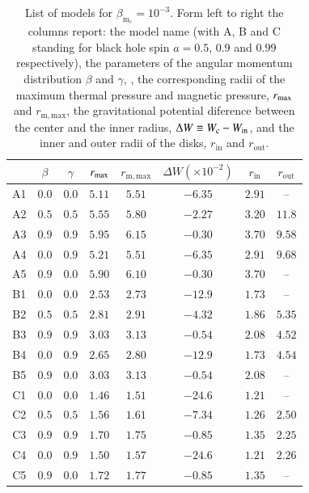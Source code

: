 \documentclass{aa}
\begin{document}
\begin{table}
\caption{List of models for $\beta_{\mathrm{m}_{\mathrm{c}}} = 10^{-3}
$. Form left to right the columns report: the model name (with A, B and C standing for black hole spin $a = 0.5$, $0.9$ and $0.99$ respectively), the parameters of the angular momentum distribution $\beta$ and $\gamma$, , the corresponding radii of the maximum thermal pressure and magnetic pressure, $r_{{\rm{max}}}$ and $r_{{\mathrm{m, max}}}$, the gravitational potential diference between the center and the inner radius, $\Delta W\equiv W_{\rm c}-W_{\rm in}$, and the inner and outer radii of the disks, $r_{\mathrm{in}}$ and $r_{\mathrm{out}}$.}             
\label{table:3}      
\centering          
\begin{tabular}{c c c c  c c c c}
\hline\hline       
 & $\beta$ & $\gamma$ & $r_{\rm{max}}$ &  $r_{\mathrm{m, max}}$ & $\Delta W (\times 10^{-2})$ & $r_{\mathrm{in}}$ & $r_{\mathrm{out}}$ \\ 
\hline           
A1 & $0.0$ & $0.0$ & $5.11$ &  $5.51$  & $-6.35$ & $2.91$ & -- \\ 
A2 & $0.5$ & $0.5$ & $5.55$ &  $5.80$  & $-2.27$ & $3.20$ & $11.8$\\ 
A3 & $0.9$ & $0.9$ & $5.95$ &  $6.15$  & $-0.30$ & $3.70$ &  $9.58$\\ 
A4 & $0.0$ & $0.9$ & $5.21$ &  $5.51$  & $-6.35$ & $2.91$ & $9.68$\\  
A5 & $0.9$ & $0.0$ & $5.90$ &  $6.10$  & $-0.30$ & $3.70$ & --\\
 \hline 
B1 & $0.0$ & $0.0$ & $2.53$ &  $2.73$  & $-12.9$ & $1.73$ & -- \\ 
B2 & $0.5$ & $0.5$ & $2.81$ &  $2.91$  & $-4.32$ & $1.86$ & $5.35$\\
B3 & $0.9$ & $0.9$ & $3.03$ &  $3.13$  & $-0.54$ & $2.08$ & $4.52$\\  
B4 & $0.0$ & $0.9$ & $2.65$ &  $2.80$  & $-12.9$ & $1.73$ & $4.54$\\ 
B5 & $0.9$ & $0.0$ & $3.03$ &  $3.13$  & $-0.54$ & $2.08$ & -- \\  
 \hline 
C1 & $0.0$ & $0.0$ & $1.46$ &  $1.51$  & $-24.6$ & $1.21$ & -- \\ 
C2 & $0.5$ & $0.5$ & $1.56$ &  $1.61$  & $-7.34$ & $1.26$ & $2.50$\\ 
C3 & $0.9$ & $0.9$ & $1.70$ &  $1.75$  & $-0.85$ & $1.35$ & $2.25$\\ 
C4 & $0.0$ & $0.9$ & $1.50$ &  $1.57$  & $-24.6$ & $1.21$ & $2.26$\\ 
C5 & $0.9$ & $0.0$ & $1.72$ &  $1.77$  & $-0.85$ & $1.35$ & --\\ 
\hline      
\end{tabular}
\end{table}
\end{document}
